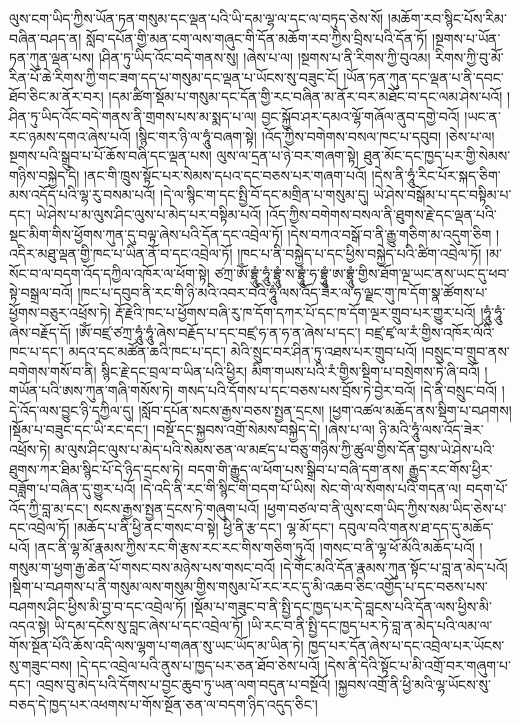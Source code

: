 ལུས་ངག་ཡིད་ཀྱིས་ཡོན་ཏན་གསུམ་དང་ལྡན་པའི་ཡི་དམ་ལྷ་ལ་དང་ལ་བཏུད་ཅེས་སོ། །མཆོག་རབ་སྙིང་པོས་རིམ་བཞིན་བཤད་ན། སློབ་དཔོན་གྱི་མན་ངག་ལས་གཞུང་གི་དོན་མཆོག་རབ་ཀྱིས་བྲིས་པའི་དོན་ཏོ། །སྔགས་པ་ཡོན་ཏན་ཀུན་ལྡན་པས། །ཤིན་ཏུ་ཡིད་འོང་བདེ་གནས་སུ། །ཞེས་པ་ལ། །སྔགས་པ་ནི་རིགས་ཀྱི་བུའམ། རིགས་ཀྱི་བུ་མོ་རིན་པོ་ཆེ་རིགས་ཀྱི་གང་ཟག་དད་པ་གསུམ་དང་ལྡན་པ་ཡོངས་སུ་བཟུང་ངོ། །ཡོན་ཏན་ཀུན་དང་ལྡན་པ་ནི་དབང་ཐོབ་ཅིང་མ་ནོར་བར། །དམ་ཚིག་སྡོམ་པ་གསུམ་དང་དོན་གྱི་རང་བཞིན་མ་ནོར་བར་མཐོང་བ་དང་ལམ་ཤེས་པའོ། །ཤིན་ཏུ་ཡིད་འོང་བདེ་གནས་ནི་གྲགས་པས་མ་སྨད་པ་ལ། བྱང་སྐྱོབ་ཤར་དམའ་ལྷོ་གཞོལ་ནུབ་དགྱེ་བའོ། །ཡང་ན་རང་ཉམས་དགའ་ཞེས་པའོ། །སྙིང་གར་ཉི་ལ་ཧཱུཾ་བཞག་སྟེ། །འོད་ཀྱིས་བགེགས་བསལ་ཁང་པ་དབུབ། །ཅེས་པ་ལ། སྔགས་པའི་སྒྲུབ་པ་པོ་ཆོས་བཞི་དང་ལྡན་པས། ལུས་ལ་དྲན་པ་ཉེ་བར་གཞག་སྟེ། ཐུན་མོང་དང་ཁྱད་པར་གྱི་སེམས་གཉིས་བསྐྱེད་དེ། །ནང་གི་ཁྲུས་སྟོང་པར་སེམས་དཔའ་དང་བཅས་པར་གཞག་པའོ། །དེས་ནི་ཧཱུཾ་རིང་པོར་སྐད་ཅིག་མས་འདོད་པའི་ལྷ་རུ་བསམ་པའོ། །དེ་ལ་སྙིང་ག་དང་སྤྱི་བོ་དང་མགྲིན་པ་གསུམ་དུ། ཡེ་ཤེས་བསྒོམ་པ་དང་བསྟིམ་པ་དང་། ཡེ་ཤེས་པ་མ་ལུས་ཤིང་ལུས་པ་མེད་པར་བསྟིམ་པའོ། །འོད་ཀྱིས་བགེགས་བསལ་ནི་ཐུགས་རྗེ་དང་ལྡན་པའི་སྡང་མིག་གིས་ཕྱོགས་ཀུན་དུ་བལྟ་ཞེས་པའི་དོན་དང་འབྲེལ་ཏོ། །དེས་བཀའ་བསྒོ་བ་ནི་རྒྱུ་གཅིག་མ་འདུག་ཅིག །འདིར་མཐུ་ལྡན་གྱི་ཁང་པ་ཡིན་ནོ་བ་དང་འབྲེལ་ཏོ། །ཁང་པ་ནི་བསྐྱེད་པ་དང་ཕྱིས་བསྐྱེད་པའི་ཚིག་འབྲེལ་ཏོ། །མ་སོང་བ་ལ་བདག་འོད་དཀྱིལ་འཁོར་ལ་ཕོག་སྟེ། ཙཀྲ་ཨོཾ་བྷྲཱུཾ་ཧཱུཾ་བྷྲཱུཾ་ས་བྷྲཱུཾ་ཧ་བྷྲཱུཾ་ཨ་བྷྲཱུཾ་གྱིས་ཐོག་ལྔ་ཡང་ནས་ཡང་དུ་ཕབ་སྟེ་བསྒྲལ་བའོ། །ཁང་པ་དབུབ་ནི་རང་གི་ཉི་མའི་འབར་བའི་ཧཱུཾ་ལས་འོད་ཟེར་ལ་ཧ་ལྗང་གུ་ཁ་དོག་སྣ་ཚོགས་པ་ཕྱོགས་བཅུར་འཕྲོས་ཏེ། རྡོ་རྗེའི་ཁང་པ་ཕྱོགས་བཞི་རུ་ཁ་དོག་དཀར་པོ་དང་ཁ་དོག་ལྔར་གྲུབ་པར་གྱུར་པའོ། །ཧཱུཾ་ཧཱུཾ་ཞེས་བརྗོད་དོ། །ཨོཾ་བཛྲ་ཙཀྲ་ཧཱུཾ་ཧཱུཾ་ཞེས་བརྗོད་པ་དང་བཛྲ་ཧ་ན་ཧ་ན་ཞེས་པ་དང་། བཛྲ་ཛྭ་ལ་རཾ་གྱིས་འཁོར་ལོའི་ཁང་པ་དང་། མདའ་དང་མཚོན་ཆའི་ཁང་པ་དང་། མེའི་སྲུང་བར་ཤིན་ཏུ་འཐས་པར་གྲུབ་པའོ། །བསྲུང་བ་གྲུབ་ནས་བགེགས་གསོ་བ་ནི། སྙིང་རྗེ་དང་བྲལ་བ་ཡིན་པའི་ཕྱིར། མིག་གཡས་པའི་རཾ་གྱིས་སྡིག་པ་བསྲེགས་ཏེ་ཞི་བའོ། །གཡོན་པའི་ཨས་ཀུན་གཞི་གསོས་ཏེ། གསད་པའི་དོགས་པ་དང་བཅས་པས་བྲོས་ཏེ་བྱེར་བའོ། །དེ་ནི་བསྲུང་བའོ། །དེ་འོད་ལས་བྱུང་ཉི་དཀྱིལ་དུ། །སློབ་དཔོན་སངས་རྒྱས་བཅས་སྤྱན་དྲངས། །ཕྱག་འཚལ་མཆོད་ནས་སྡིག་པ་བཤགས། །སྡོམ་པ་བཟུང་དང་ཡི་རང་དང་། །བསྔོ་དང་སྐྱབས་འགྲོ་སེམས་བསྐྱེད་དེ། །ཞེས་པ་ལ། ཉི་མའི་ཧཱུཾ་ལས་འོད་ཟེར་འཕྲོས་ཏེ། མ་ལུས་ཤིང་ལུས་པ་མེད་པའི་སེམས་ཅན་ལ་མཛད་པ་བཅུ་གཉིས་ཀྱི་ཚུལ་གྱིས་དོན་བྱས་ཡེ་ཤེས་པའི་ཐུགས་ཀར་ཐིམ་སྙིང་པོ་དེ་ཉིད་དྲངས་ཏེ། བདག་གི་རྒྱུད་ལ་ཕོག་པས་སྒྲིབ་པ་བཞི་དག་ནས། རྒྱུད་རང་གོས་ཕྱིར་བཟློག་པ་བཞིན་དུ་གྱུར་པའོ། །དེ་འདི་ནི་རང་གི་སྙིང་གི་བདག་པོ་ཡིས། སེང་གེ་ལ་སོགས་པའི་གདན་ལ། བདག་པོ་འོད་ཀྱི་བླ་མ་དང་། སངས་རྒྱས་སྤྱན་དྲངས་ཏེ་གཞུག་པའོ། །ཕྱག་བཙལ་བ་ནི་ལུས་ངག་ཡིད་ཀྱིས་སམ་ཡིད་ཅེས་པ་དང་འབྲེལ་ཏོ། །མཆོད་པ་ནི་ཕྱི་ནང་གསང་བ་སྟེ། ཕྱི་ནི་རྩ་དང་། ལྷ་མོ་དང་། དབུལ་བའི་གནས་ཐ་དད་དུ་མཆོད་པའོ། །ནང་ནི་ལྷ་མོ་རྣམས་ཀྱིས་རང་གི་རྩས་རང་རང་གིས་གཅིག་ཏུའོ། །གསང་བ་ནི་ལྷ་ཕོ་མོའི་མཆོད་པའོ། །གསུམ་ག་ཕྱག་རྒྱ་ཆེན་པོ་གསང་བས་མཉེས་པས་གསང་བའོ། །དེ་གོང་མའི་དོན་རྣམས་ཀུན་སྟོང་པ་བླ་ན་མེད་པའོ། །སྡིག་པ་བཤགས་པ་ནི་གསུམ་ལས་གསུམ་གྱིས་གསུམ་པོ་རང་རང་དུ་མི་འཆབ་ཅིང་འགྱོད་པ་དང་བཅས་པས་བཤགས་ཤིང་ཕྱིས་མི་བྱ་བ་དང་འབྲེལ་ཏོ། །སྡོམ་པ་གཟུང་བ་ནི་སྤྱི་དང་ཁྱད་པར་དེ་བླངས་པའི་དོན་ལས་ཕྱིས་མི་འདའ་སྟེ། ཡི་དམ་དངོས་སུ་བླང་ཞེས་པ་དང་འབྲེལ་ཏོ། །ཡི་རང་བ་ནི་སྤྱི་དང་ཁྱད་པར་ཏེ་བླ་ན་མེད་པའི་ལམ་ལ་གོས་སྔོན་པོའི་ཆོས་འདི་ལས་ལྷག་པ་གཞན་སུ་ཡང་ཡོད་མ་ཡིན་ཏེ། ཁྱད་པར་དོན་ཞེས་པ་དང་འབྲེལ་པར་ཡོངས་སུ་གཟུང་བས། །དེ་དང་འབྲེལ་པའི་ནུས་པ་ཁྱད་པར་ཅན་ཐོབ་ཅེས་པའོ། །དེས་ནི་དེའི་སྟོང་པ་མི་འགྲོ་བར་གཞུག་པ་དང་། འབྲས་བུ་མེད་པའི་དོགས་པ་བྱང་ཆུབ་ཏུ་ཡན་ལག་བདུན་པ་བསྔོའོ། །སྐྱབས་འགྲོ་ནི་ཕྱི་མའི་ལྷ་ཡོངས་སུ་བཅད་དེ་ཁྱད་པར་འཕགས་པ་གོས་སྔོན་ཅན་ལ་བདག་ཉིད་འདུད་ཅིང་། 